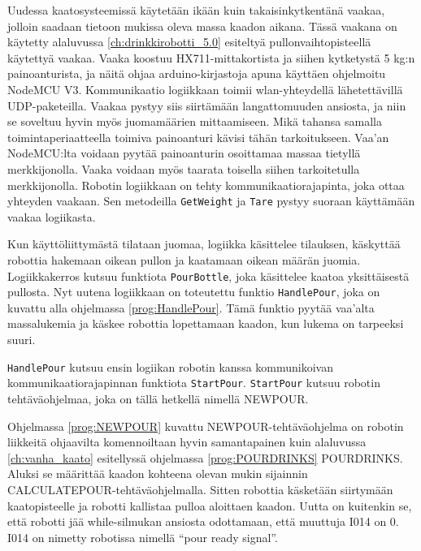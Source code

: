 Uudessa kaatosysteemissä käytetään ikään kuin takaisinkytkentänä vaakaa, jolloin saadaan tietoon mukissa oleva massa kaadon aikana. Tässä vaakana on käytetty alaluvussa \ref{ch:drinkkirobotti_5.0} esiteltyä pullonvaihtopisteellä käytettyä vaakaa. Vaaka koostuu HX711\hyp{}mittakortista ja siihen kytketystä 5 kg:n painoanturista, ja näitä ohjaa arduino\hyp{}kirjastoja apuna käyttäen ohjelmoitu NodeMCU V3. Kommunikaatio logiikkaan toimii wlan\hyp{}yhteydellä lähetettävillä UDP\hyp{}paketeilla. \cite{Virtanen2019} Vaakaa pystyy siis siirtämään langattomuuden ansiosta, ja niin se soveltuu hyvin myös juomamäärien mittaamiseen. Mikä tahansa samalla toimintaperiaatteella toimiva painoanturi kävisi tähän tarkoitukseen. Vaa'an NodeMCU:lta voidaan pyytää painoanturin osoittamaa massaa tietyllä merkkijonolla. Vaaka voidaan myös taarata toisella siihen tarkoitetulla merkkijonolla. Robotin logiikkaan on tehty kommunikaatiorajapinta, joka ottaa yhteyden vaakaan. Sen metodeilla \texttt{GetWeight} ja \texttt{Tare} pystyy suoraan käyttämään vaakaa logiikasta.

Kun käyttöliittymästä tilataan juomaa, logiikka käsittelee tilauksen, käskyttää robottia hakemaan oikean pullon ja kaatamaan oikean määrän juomia. Logiikkakerros kutsuu funktiota \texttt{PourBottle}, joka käsittelee kaatoa yksittäisestä pullosta. Nyt uutena logiikkaan on toteutettu funktio \texttt{HandlePour}, joka on kuvattu alla ohjelmassa \ref{prog:HandlePour}. Tämä funktio pyytää vaa'alta massalukemia ja käskee robottia lopettamaan kaadon, kun lukema on tarpeeksi suuri.

\newpage

\lstset{style=sharpc}


\texttt{HandlePour} kutsuu ensin logiikan robotin kanssa kommunikoivan kommunikaatiorajapinnan funktiota \texttt{StartPour}. \texttt{StartPour} kutsuu robotin tehtäväohjelmaa, joka on tällä hetkellä nimellä NEWPOUR.

\lstset{style=Yaskawatyyli}


Ohjelmassa \ref{prog:NEWPOUR} kuvattu NEWPOUR\hyp{}tehtäväohjelma on robotin liikkeitä ohjaavilta komennoiltaan hyvin samantapainen kuin alaluvussa \ref{ch:vanha_kaato} esitellyssä ohjelmassa \ref{prog:POURDRINKS} POURDRINKS. Aluksi se määrittää kaadon kohteena olevan mukin sijainnin CALCULATEPOUR\hyp{}tehtäväohjelmalla. Sitten robottia käsketään siirtymään kaatopisteelle ja robotti kallistaa pulloa aloittaen kaadon. Uutta on kuitenkin se, että robotti jää while\hyp{}silmukan ansiosta odottamaan, että muuttuja I014 on 0. I014 on nimetty robotissa nimellä ``pour ready signal''.

